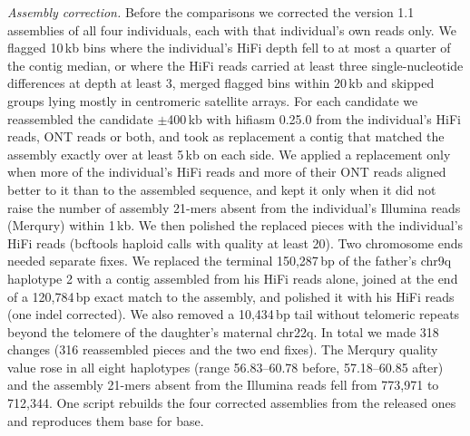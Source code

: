 \documentclass[pdflatex,mathphys]{jnl}
\begin{document}
\emph{Assembly correction.} Before the comparisons we corrected the version 1.1 assemblies of all
four individuals, each with that individual's own reads only. We flagged 10\,kb bins where the
individual's HiFi depth fell to at most a quarter of the contig median, or where the HiFi reads
carried at least three single-nucleotide differences at depth at least 3, merged flagged bins
within 20\,kb and skipped groups lying mostly in centromeric satellite arrays. For each candidate we reassembled the candidate $\pm$400\,kb with hifiasm 0.25.0 from
the individual's HiFi reads, ONT reads or both, and took as replacement a contig that matched the
assembly exactly over at least 5\,kb on each side. We applied a replacement only when more of the
individual's HiFi reads and more of their ONT reads aligned better to it than to the assembled
sequence, and kept it only when it did not raise the number of assembly 21-mers absent from the
individual's Illumina reads (Merqury) within 1\,kb. We then polished the replaced pieces with the
individual's HiFi reads (bcftools haploid calls with quality at least 20). Two chromosome ends
needed separate fixes. We replaced the terminal 150,287\,bp of the father's chr9q haplotype 2 with a
contig assembled from his HiFi reads alone, joined at the end of a 120,784\,bp exact match to the
assembly, and polished it with his HiFi reads (one indel corrected). We also removed a 10,434\,bp tail without telomeric repeats beyond the telomere of the
daughter's maternal chr22q. In total we made 318 changes (316 reassembled pieces and the two end
fixes). The Merqury quality value rose in all eight haplotypes (range 56.83--60.78 before, 57.18--60.85
after) and the assembly 21-mers absent from the Illumina reads fell from 773,971 to 712,344. One
script rebuilds the four corrected assemblies from the released ones and reproduces them base for
base.
\end{document}
